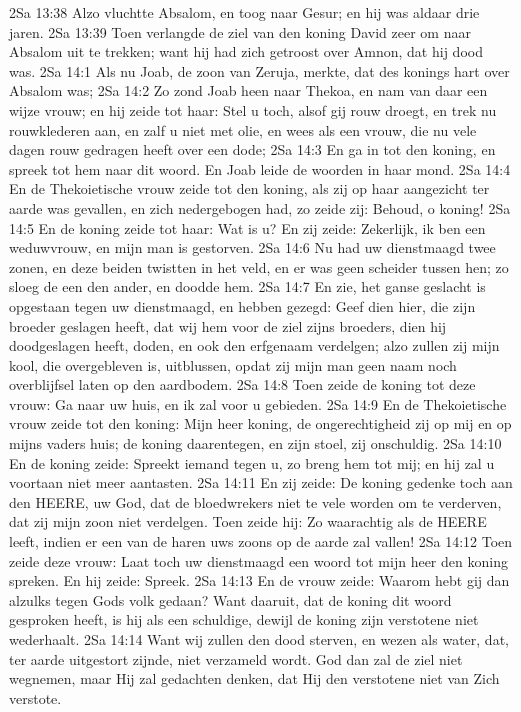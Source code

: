 2Sa 13:38  Alzo vluchtte Absalom, en toog naar Gesur; en hij was aldaar drie jaren.
2Sa 13:39  Toen verlangde de ziel van den koning David zeer om naar Absalom uit te trekken; want hij had zich getroost over Amnon, dat hij dood was.
2Sa 14:1  Als nu Joab, de zoon van Zeruja, merkte, dat des konings hart over Absalom was;
2Sa 14:2  Zo zond Joab heen naar Thekoa, en nam van daar een wijze vrouw; en hij zeide tot haar: Stel u toch, alsof gij rouw droegt, en trek nu rouwklederen aan, en zalf u niet met olie, en wees als een vrouw, die nu vele dagen rouw gedragen heeft over een dode;
2Sa 14:3  En ga in tot den koning, en spreek tot hem naar dit woord. En Joab leide de woorden in haar mond.
2Sa 14:4  En de Thekoietische vrouw zeide tot den koning, als zij op haar aangezicht ter aarde was gevallen, en zich nedergebogen had, zo zeide zij: Behoud, o koning!
2Sa 14:5  En de koning zeide tot haar: Wat is u? En zij zeide: Zekerlijk, ik ben een weduwvrouw, en mijn man is gestorven.
2Sa 14:6  Nu had uw dienstmaagd twee zonen, en deze beiden twistten in het veld, en er was geen scheider tussen hen; zo sloeg de een den ander, en doodde hem.
2Sa 14:7  En zie, het ganse geslacht is opgestaan tegen uw dienstmaagd, en hebben gezegd: Geef dien hier, die zijn broeder geslagen heeft, dat wij hem voor de ziel zijns broeders, dien hij doodgeslagen heeft, doden, en ook den erfgenaam verdelgen; alzo zullen zij mijn kool, die overgebleven is, uitblussen, opdat zij mijn man geen naam noch overblijfsel laten op den aardbodem.
2Sa 14:8  Toen zeide de koning tot deze vrouw: Ga naar uw huis, en ik zal voor u gebieden.
2Sa 14:9  En de Thekoietische vrouw zeide tot den koning: Mijn heer koning, de ongerechtigheid zij op mij en op mijns vaders huis; de koning daarentegen, en zijn stoel, zij onschuldig.
2Sa 14:10  En de koning zeide: Spreekt iemand tegen u, zo breng hem tot mij; en hij zal u voortaan niet meer aantasten.
2Sa 14:11  En zij zeide: De koning gedenke toch aan den HEERE, uw God, dat de bloedwrekers niet te vele worden om te verderven, dat zij mijn zoon niet verdelgen. Toen zeide hij: Zo waarachtig als de HEERE leeft, indien er een van de haren uws zoons op de aarde zal vallen!
2Sa 14:12  Toen zeide deze vrouw: Laat toch uw dienstmaagd een woord tot mijn heer den koning spreken. En hij zeide: Spreek.
2Sa 14:13  En de vrouw zeide: Waarom hebt gij dan alzulks tegen Gods volk gedaan? Want daaruit, dat de koning dit woord gesproken heeft, is hij als een schuldige, dewijl de koning zijn verstotene niet wederhaalt.
2Sa 14:14  Want wij zullen den dood sterven, en wezen als water, dat, ter aarde uitgestort zijnde, niet verzameld wordt. God dan zal de ziel niet wegnemen, maar Hij zal gedachten denken, dat Hij den verstotene niet van Zich verstote.
